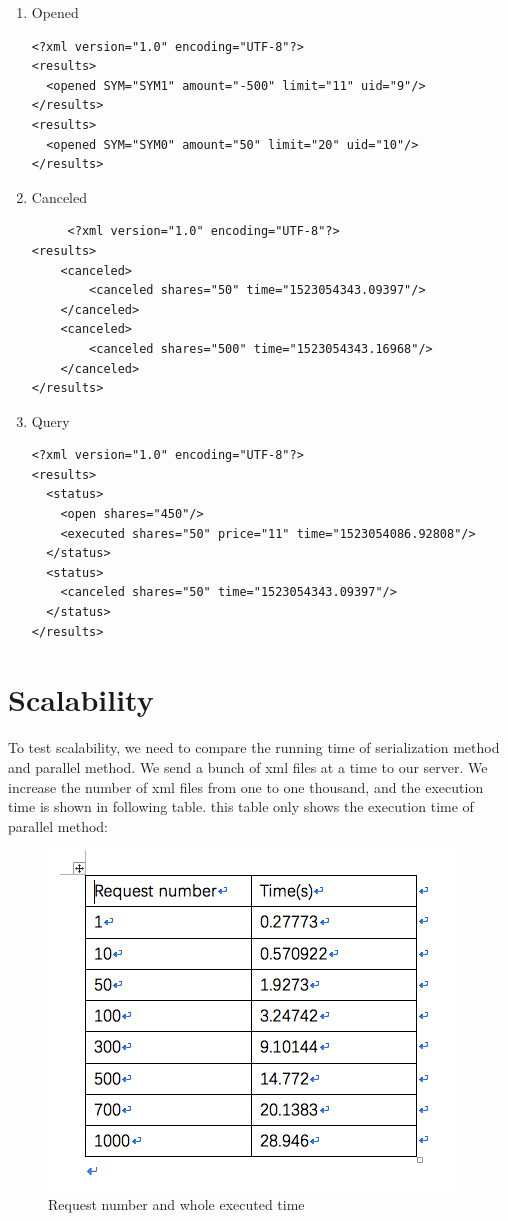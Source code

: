 \documentclass{article}
\begin{document}
\begin{enumerate}
\begin{enumerate}
      
     \item Opened
     \begin{lstlisting}
<?xml version="1.0" encoding="UTF-8"?>
<results>
  <opened SYM="SYM1" amount="-500" limit="11" uid="9"/>
</results>
<results>
  <opened SYM="SYM0" amount="50" limit="20" uid="10"/>
</results>
     \end{lstlisting}
     
     \item Canceled
     \begin{lstlisting}
     <?xml version="1.0" encoding="UTF-8"?>
<results>
	<canceled>
		<canceled shares="50" time="1523054343.09397"/>
	</canceled>
	<canceled>
		<canceled shares="500" time="1523054343.16968"/>
	</canceled>
</results>
     \end{lstlisting}
     
     \item Query
     \begin{lstlisting}
<?xml version="1.0" encoding="UTF-8"?>
<results>
  <status>
    <open shares="450"/>
    <executed shares="50" price="11" time="1523054086.92808"/>
  </status>
  <status>
    <canceled shares="50" time="1523054343.09397"/>
  </status>
</results>
     \end{lstlisting}
      \end{enumerate}
      
\end{enumerate}

\section{Scalability}
To test scalability, we need to compare the running time of serialization method and parallel method. We send a bunch of xml files at a time to our server. We increase the number of xml files from one to one thousand, and the execution time is shown in following table. this table only shows the execution time of parallel method: 

\begin{figure}[h!]
\centering
\includegraphics[scale=0.5]{Snip2}
\caption{Request number and whole executed time}
\label{fig:Snip2}
\end{figure}
\end{document}
